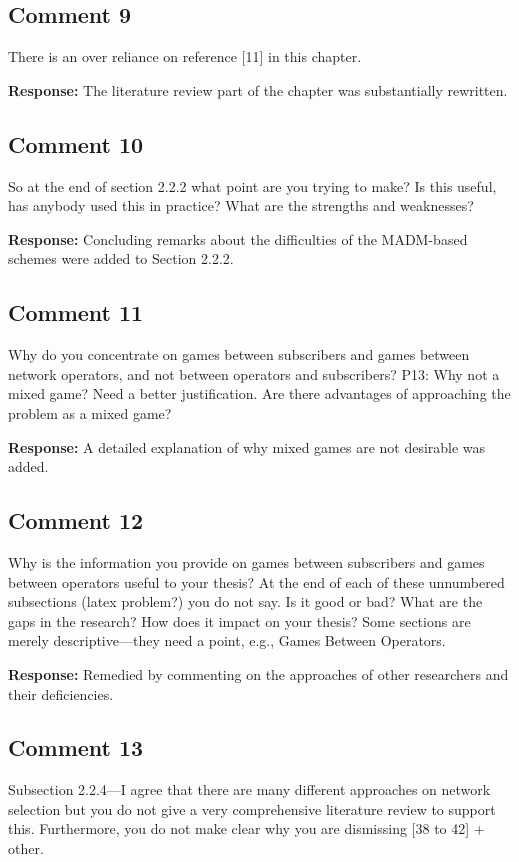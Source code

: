 \documentclass[10pt,a4paper,notitlepage]{article}
\numberwithin{equation}{section}
\begin{document}
\subsection{Comment 9}
There is an over reliance on reference [11] in this chapter.

\textbf{Response:}
The literature review part of the chapter was substantially rewritten.

\subsection{Comment 10}
So at the end of section 2.2.2 what point are you trying to make? Is this useful, has anybody used this in practice? What are the strengths and weaknesses?

\textbf{Response:}
Concluding remarks about the difficulties of the MADM-based schemes were added to Section 2.2.2.

\subsection{Comment 11}
Why do you concentrate on games between subscribers and games between network operators, and not between operators and subscribers? P13: Why not a mixed game? Need a better justification. Are there advantages of approaching the problem as a mixed game?

\textbf{Response:}
A detailed explanation of why mixed games are not desirable was added.

\subsection{Comment 12}
Why is the information you provide on games between subscribers and games between operators useful to your thesis? At the end of each of these unnumbered subsections (latex problem?) you do not say. Is it good or bad? What are the gaps in the research? How does it impact on your thesis? Some sections are merely descriptive---they need a point, e.g., Games Between Operators.

\textbf{Response:}
Remedied by commenting on the approaches of other researchers and their deficiencies.

\subsection{Comment 13}
Subsection 2.2.4---I agree that there are many different approaches on network selection but you do not give a very comprehensive literature review to support this. Furthermore, you do not make clear why you are dismissing [38 to 42] + other.
\end{document}
